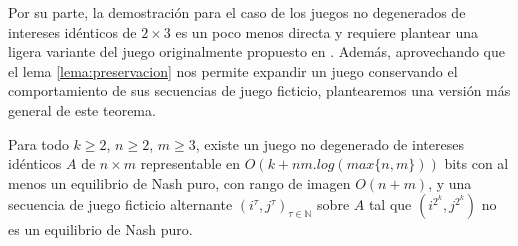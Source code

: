 Por su parte, la demostración para el caso de los juegos no degenerados de intereses idénticos de $2 \times 3$ es un poco menos directa y requiere plantear una ligera variante del juego originalmente propuesto en \cite{brandt:rate:convergence}. Además, aprovechando que el lema \ref{lema:preservacion} nos permite expandir un juego conservando el comportamiento de sus secuencias de juego ficticio, plantearemos una versión más general de este teorema. 

\begin{theorem} \label{teorema:afp:velocidad:nondegen}
    Para todo $k \geq 2$, $n\geq 2$, $m\geq 3$, existe un juego no degenerado de intereses idénticos $A$ de $n\times m$ representable en $O(k+nm. log(max\{n,m\}))$ bits con al menos un equilibrio de Nash puro, con rango de imagen $O(n+m)$, y una secuencia de juego ficticio alternante $(i^\tau, j^\tau)_{\tau \in \mathbb{N}}$ sobre $A$ tal que $(i^{2^k}, j^{2^k})$ no es un equilibrio de Nash puro.
\end{theorem}
